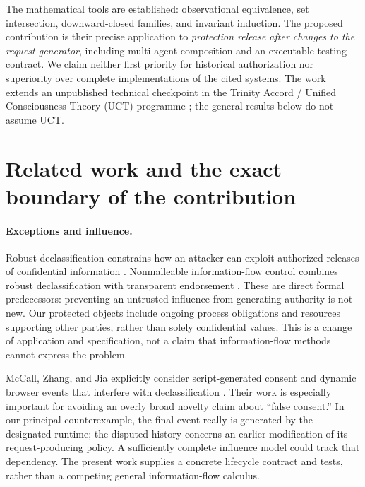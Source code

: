 \documentclass[11pt,a4paper]{article}
\theoremstyle{definition}\newtheorem{definition}{Definition}
\begin{document}
The mathematical tools are established: observational equivalence, set intersection, downward-closed families, and invariant induction. The proposed contribution is their precise application to \emph{protection release after changes to the request generator}, including multi-agent composition and an executable testing contract. We claim neither first priority for historical authorization nor superiority over complete implementations of the cited systems. The work extends an unpublished technical checkpoint in the Trinity Accord / Unified Consciousness Theory (UCT) programme \cite{liucheckpoint}; the general results below do not assume UCT.

\section{Related work and the exact boundary of the contribution}
\label{sec:related}
\paragraph{Exceptions and influence.}
Robust declassification constrains how an attacker can exploit authorized releases of confidential information \cite{myers}. Nonmalleable information-flow control combines robust declassification with transparent endorsement \cite{cecchetti}. These are direct formal predecessors: preventing an untrusted influence from generating authority is not new. Our protected objects include ongoing process obligations and resources supporting other parties, rather than solely confidential values. This is a change of application and specification, not a claim that information-flow methods cannot express the problem.

McCall, Zhang, and Jia explicitly consider script-generated consent and dynamic browser events that interfere with declassification \cite{mccall}. Their work is especially important for avoiding an overly broad novelty claim about ``false consent.'' In our principal counterexample, the final event really is generated by the designated runtime; the disputed history concerns an earlier modification of its request-producing policy. A sufficiently complete influence model could track that dependency. The present work supplies a concrete lifecycle contract and tests, rather than a competing general information-flow calculus.
\end{document}
